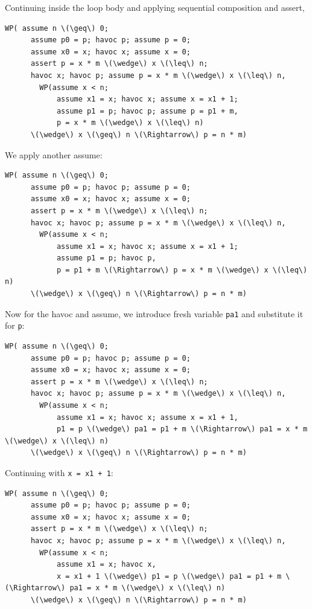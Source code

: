 \documentclass[11pt]{article}
\begin{document}
Continuing inside the loop body and applying sequential composition and \textsf{assert},
\begin{Verbatim}[commandchars=\\\{\}]
  WP( assume n \(\geq\) 0;
      assume p0 = p; havoc p; assume p = 0; 
      assume x0 = x; havoc x; assume x = 0; 
      assert p = x * m \(\wedge\) x \(\leq\) n;
      havoc x; havoc p; assume p = x * m \(\wedge\) x \(\leq\) n,
        WP(assume x < n; 
            assume x1 = x; havoc x; assume x = x1 + 1; 
            assume p1 = p; havoc p; assume p = p1 + m,
            p = x * m \(\wedge\) x \(\leq\) n)
      \(\wedge\) x \(\geq\) n \(\Rightarrow\) p = n * m)
\end{Verbatim}
We apply another \textsf{assume}:
\begin{Verbatim}[commandchars=\\\{\}]
  WP( assume n \(\geq\) 0;
      assume p0 = p; havoc p; assume p = 0; 
      assume x0 = x; havoc x; assume x = 0; 
      assert p = x * m \(\wedge\) x \(\leq\) n;
      havoc x; havoc p; assume p = x * m \(\wedge\) x \(\leq\) n,
        WP(assume x < n; 
            assume x1 = x; havoc x; assume x = x1 + 1; 
            assume p1 = p; havoc p,
            p = p1 + m \(\Rightarrow\) p = x * m \(\wedge\) x \(\leq\) n)
      \(\wedge\) x \(\geq\) n \(\Rightarrow\) p = n * m)
\end{Verbatim}
Now for the \textsf{havoc} and \textsf{assume}, we introduce fresh variable \texttt{pa1} and substitute it for \texttt{p}:
\begin{Verbatim}[commandchars=\\\{\}]
  WP( assume n \(\geq\) 0;
      assume p0 = p; havoc p; assume p = 0; 
      assume x0 = x; havoc x; assume x = 0; 
      assert p = x * m \(\wedge\) x \(\leq\) n;
      havoc x; havoc p; assume p = x * m \(\wedge\) x \(\leq\) n,
        WP(assume x < n; 
            assume x1 = x; havoc x; assume x = x1 + 1,
            p1 = p \(\wedge\) pa1 = p1 + m \(\Rightarrow\) pa1 = x * m \(\wedge\) x \(\leq\) n)
      \(\wedge\) x \(\geq\) n \(\Rightarrow\) p = n * m)
\end{Verbatim}
Continuing with \texttt{x = x1 + 1}:
\begin{Verbatim}[commandchars=\\\{\}]
  WP( assume n \(\geq\) 0;
      assume p0 = p; havoc p; assume p = 0; 
      assume x0 = x; havoc x; assume x = 0; 
      assert p = x * m \(\wedge\) x \(\leq\) n;
      havoc x; havoc p; assume p = x * m \(\wedge\) x \(\leq\) n,
        WP(assume x < n; 
            assume x1 = x; havoc x,
            x = x1 + 1 \(\wedge\) p1 = p \(\wedge\) pa1 = p1 + m \(\Rightarrow\) pa1 = x * m \(\wedge\) x \(\leq\) n)
      \(\wedge\) x \(\geq\) n \(\Rightarrow\) p = n * m)
\end{Verbatim}
\end{document}
